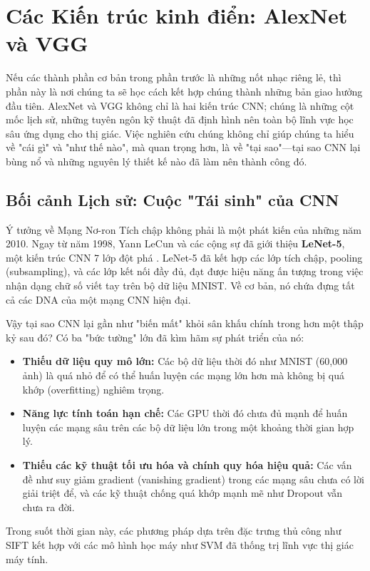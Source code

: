 \section{Các Kiến trúc kinh điển: AlexNet và VGG}
\label{sec:classic_architectures}

Nếu các thành phần cơ bản trong phần trước là những nốt nhạc riêng lẻ, thì phần này là nơi chúng ta sẽ học cách kết hợp chúng thành những bản giao hưởng đầu tiên. AlexNet và VGG không chỉ là hai kiến trúc CNN; chúng là những cột mốc lịch sử, những tuyên ngôn kỹ thuật đã định hình nên toàn bộ lĩnh vực học sâu ứng dụng cho thị giác. Việc nghiên cứu chúng không chỉ giúp chúng ta hiểu về "cái gì" và "như thế nào", mà quan trọng hơn, là về "tại sao"—tại sao CNN lại bùng nổ và những nguyên lý thiết kế nào đã làm nên thành công đó.

\subsection{Bối cảnh Lịch sử: Cuộc "Tái sinh" của CNN}
\label{subsec:historical_context_cnn_rebirth}

Ý tưởng về Mạng Nơ-ron Tích chập không phải là một phát kiến của những năm 2010. Ngay từ năm 1998, Yann LeCun và các cộng sự đã giới thiệu \textbf{LeNet-5}, một kiến trúc CNN 7 lớp đột phá \cite{LeCun1998}. LeNet-5 đã kết hợp các lớp tích chập, pooling (subsampling), và các lớp kết nối đầy đủ, đạt được hiệu năng ấn tượng trong việc nhận dạng chữ số viết tay trên bộ dữ liệu MNIST. Về cơ bản, nó chứa đựng tất cả các DNA của một mạng CNN hiện đại.

Vậy tại sao CNN lại gần như "biến mất" khỏi sân khấu chính trong hơn một thập kỷ sau đó? Có ba "bức tường" lớn đã kìm hãm sự phát triển của nó:
\begin{itemize}
	\item \textbf{Thiếu dữ liệu quy mô lớn:} Các bộ dữ liệu thời đó như MNIST (60,000 ảnh) là quá nhỏ để có thể huấn luyện các mạng lớn hơn mà không bị quá khớp (overfitting) nghiêm trọng.
	\item \textbf{Năng lực tính toán hạn chế:} Các GPU thời đó chưa đủ mạnh để huấn luyện các mạng sâu trên các bộ dữ liệu lớn trong một khoảng thời gian hợp lý.
	\item \textbf{Thiếu các kỹ thuật tối ưu hóa và chính quy hóa hiệu quả:} Các vấn đề như suy giảm gradient (vanishing gradient) trong các mạng sâu chưa có lời giải triệt để, và các kỹ thuật chống quá khớp mạnh mẽ như Dropout vẫn chưa ra đời.
\end{itemize}
Trong suốt thời gian này, các phương pháp dựa trên đặc trưng thủ công như SIFT kết hợp với các mô hình học máy như SVM đã thống trị lĩnh vực thị giác máy tính.


